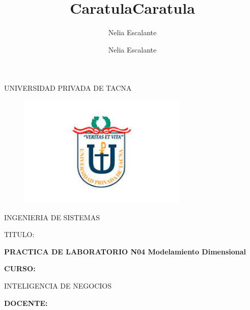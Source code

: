 \documentclass[12pt,letterpaper]{article}
\author{Nelia Escalante}
\title{Caratula}
\begin{document}
\author{Nelia Escalante}
\title{Caratula}

\begin{titlepage}
\begin{center}
\large{UNIVERSIDAD PRIVADA DE TACNA}\\
\vspace*{-0.025in}
\begin{figure}[htb]
\begin{center}
\includegraphics[width=8cm]{./IMG/logo}
\end{center}
\end{figure}
\vspace*{0.15in}
INGENIERIA DE SISTEMAS  \\

\vspace*{0.5in}
\begin{large}
TITULO:\\
\end{large}

\vspace*{0.1in}
\begin{Large}
\textbf{PRACTICA DE LABORATORIO N04 Modelamiento Dimensional} \\
\end{Large}

\vspace*{0.3in}
\begin{Large}
\textbf{CURSO:} \\
\end{Large}

\vspace*{0.1in}
\begin{large}
INTELIGENCIA DE NEGOCIOS\\
\end{large}

\vspace*{0.3in}
\begin{Large}
\textbf{DOCENTE:} \\
\end{Large}


\end{center}
\end{titlepage}
\end{document}
